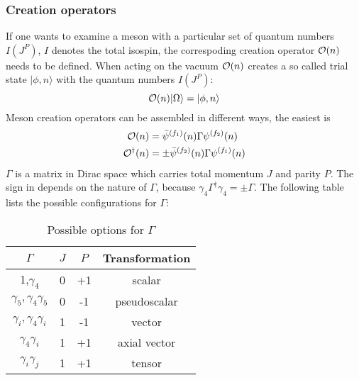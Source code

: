     \subsubsection{Creation operators}
        If one wants to examine a meson with a particular set of quantum numbers $I(J^P)$, $I$ denotes the total isospin, the correspoding creation operator $\mathcal{O}(n)$ needs to be defined. When acting on the vacuum $\mathcal{O}(n)$ creates a so called trial state $|\phi,n\rangle$ with the quantum numbers $I(J^P)$:
        \begin{equation}
            \mathcal{O}(n)|\Omega\rangle = |\phi,n\rangle
        \end{equation}
        Meson creation operators can be assembled in different ways, the easiest is
        \begin{equation}\label{meson_creation_operator}
            \begin{aligned}
                \mathcal{O}(n) &= \bar{\psi}^{(f_1)}(n)\Gamma\psi^{(f_2)}(n)\\
                \mathcal{O}^\dagger(n) &= \pm\bar{\psi}^{(f_2)}(n)\Gamma\psi^{(f_1)}(n)
            \end{aligned}
        \end{equation}
        $\Gamma$ is a matrix in Dirac space which carries total momentum $J$ and parity $P$. The sign in  depends on the nature of $\Gamma$, because $\gamma_4\Gamma^\dagger\gamma_4 = \pm \Gamma$. The following table lists the possible configurations for $\Gamma$:
        \begin{table}[h]
            \centering
            \begin{tabular}{|c|c|c|c|}
            \hline
            \multicolumn{1}{|c|}{$\Gamma$} & \multicolumn{1}{c|}{$J$} & \multicolumn{1}{c|}{$P$} & \multicolumn{1}{c|}{Transformation} \\ \hline
             1,$\gamma_4$ & 0 & +1 &    scalar           \\
             $\gamma_5, \gamma_4\gamma_5$ & 0 & -1 & pseudoscalar\\
             $\gamma_i,\gamma_4\gamma_i$ & 1 & -1 &  vector \\
             $\gamma_4\gamma_i$ & 1 & +1 & axial vector\\
              $\gamma_i\gamma_j$ & 1 & +1 & tensor \\
              \hline
            \end{tabular}
            \caption{Possible options for $\Gamma$}
            \label{my-label}
        \end{table}
